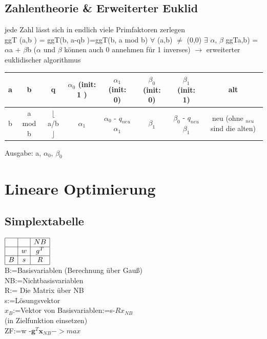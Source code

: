 \documentclass[]{article}
\begin{document}
\subsection{Zahlentheorie \& Erweiterter Euklid} 
jede Zahl lässt sich in endlich viele Primfaktoren zerlegen\\
ggT (a,b ) = ggT(b, a-qb )=ggT(b, a mod b) $\forall$ (a,b) $\neq$ (0,0)
$\exists$ $\alpha$, $\beta$ ggTa,b) = $\alpha$a + $\beta$b ($\alpha$ und $\beta$ können auch 0 annehmen für 1 inverses)
$\rightarrow$ erweiterter euklidischer algorithmus
\begin{tabular}{|c|c|c|c|c|c|c|c|}
	\hline
	a & b  &  q                                           &$\alpha_0$ (init: 1 ) &$\alpha_1$ (init: 0)  &$\beta_0$ (init: 0) &$\beta_1$ (init: 1) & alt   \\
	\hline                        
	b	& a mod b & $\lfloor$a/b$\rfloor$  & $\alpha_1$ &$\alpha_0$ - $q_{neu}$$\alpha_1$    & $\beta_1$ &$\beta_0$ - $q_{neu}$$\beta_1$  & neu (ohne $_{neu}$ sind die alten)\\
	\hline
\end{tabular}
Ausgabe: a, $\alpha_0$, $\beta_0$ \\
\newpage
\section{Lineare Optimierung}
\subsection{Simplextabelle}
$\begin{array}{|c|c|c|}
\hline
&  & NB \\
\hline
& w & g^T \\
\hline
B  & s & R\\
\hline
\end{array}
$
\\
B:=Basisvariablen (Berechnung über Gauß)\\
NB:=Nichtbasisvariablen\\
R:= Die Matrix über NB \\
s:=Lösungsvektor\\
$x_B$:=Vektor von Basisvariablen:=s-$Rx_{NB}$\\ (in Zielfunktion einsetzen)\\
ZF:=w -$\mathbf{g}^T\mathbf{x}_{NB}->max$
\end{document}

